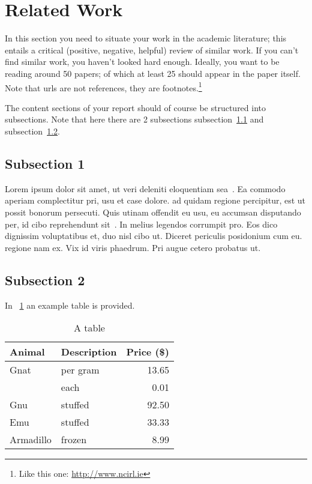 
\section{Related Work}
\label{sec:rw}

In this section you need to situate your work in the academic literature; this entails a critical (positive, negative, helpful) review of similar work. If you can't find similar work, you haven't looked hard enough. Ideally, you want to be reading around 50 papers; of which at least 25 should appear in the paper itself. Note that urls are not references, they are footnotes.\footnote{Like this one: \url{http://www.ncirl.ie}}

The content sections of your report should of course be structured into subsections. Note that here there are 2 subsections subsection~\ref{sec:Subsection1} and subsection~\ref{sec:Subsection2}.

\subsection{Subsection 1}
\label{sec:Subsection1}

Lorem ipsum dolor sit amet, ut veri deleniti eloquentiam sea~\cite{FengB16}. Ea commodo aperiam complectitur pri, usu et case dolore. \cite{KuneKARB16} ad quidam regione percipitur, est ut possit bonorum persecuti. Quis utinam offendit eu usu, eu accumsan disputando per, id cibo reprehendunt sit~\cite{BeloglazovB15,GomesCT15}. In melius legendos corrumpit pro. Eos dico dignissim voluptatibus et, duo nisl cibo ut. Diceret periculis posidonium cum eu. \cite{GomesCT15} regione nam ex. Vix id viris phaedrum. Pri augue cetero probatus ut.

\subsection{Subsection 2}
\label{sec:Subsection2}

In \tablename~\ref{tbl:aTable} an example table is provided. 

\begin{table}[htb]
\centering
\begin{tabular}{|llr|}
\hline
Animal    & Description & Price (\$) \\\hline
Gnat      & per gram    & 13.65      \\\hline
          & each        & 0.01       \\\hline
Gnu       & stuffed     & 92.50      \\\hline
Emu       & stuffed     & 33.33      \\\hline
Armadillo & frozen      & 8.99       \\\hline
\end{tabular}
\caption{A table}
\label{tbl:aTable}
\end{table}